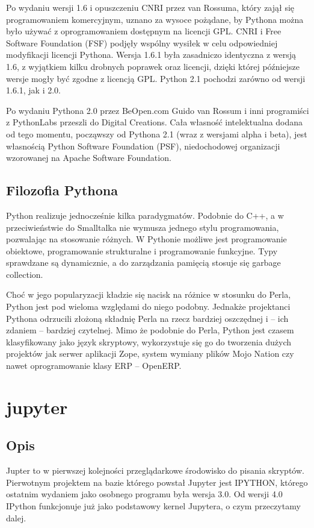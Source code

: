 \documentclass{article}
\begin{document}
Po wydaniu wersji 1.6 i opuszczeniu CNRI przez van Rossuma, który zajął się programowaniem komercyjnym, uznano za wysoce pożądane, by Pythona można było używać z oprogramowaniem dostępnym na licencji GPL. CNRI i Free Software Foundation (FSF) podjęły wspólny wysiłek w celu odpowiedniej modyfikacji licencji Pythona. Wersja 1.6.1 była zasadniczo identyczna z wersją 1.6, z wyjątkiem kilku drobnych poprawek oraz licencji, dzięki której późniejsze wersje mogły być zgodne z licencją GPL. Python 2.1 pochodzi zarówno od wersji 1.6.1, jak i 2.0.

Po wydaniu Pythona 2.0 przez BeOpen.com Guido van Rossum i inni programiści z PythonLabs przeszli do Digital Creations. Cała własność intelektualna dodana od tego momentu, począwszy od Pythona 2.1 (wraz z wersjami alpha i beta), jest własnością Python Software Foundation (PSF), niedochodowej organizacji wzorowanej na Apache Software Foundation.
 \subsection{Filozofia Pythona} 
 Python realizuje jednocześnie kilka paradygmatów. Podobnie do C++, a w przeciwieństwie do Smalltalka nie wymusza jednego stylu programowania, pozwalając na stosowanie różnych. W Pythonie możliwe jest programowanie obiektowe, programowanie strukturalne i programowanie funkcyjne. Typy sprawdzane są dynamicznie, a do zarządzania pamięcią stosuje się garbage collection.

Choć w jego popularyzacji kładzie się nacisk na różnice w stosunku do Perla, Python jest pod wieloma względami do niego podobny. Jednakże projektanci Pythona odrzucili złożoną składnię Perla na rzecz bardziej oszczędnej i – ich zdaniem – bardziej czytelnej. Mimo że podobnie do Perla, Python jest czasem klasyfikowany jako język skryptowy, wykorzystuje się go do tworzenia dużych projektów jak serwer aplikacji Zope, system wymiany plików Mojo Nation czy nawet oprogramowanie klasy ERP – OpenERP.
 \newpage
\section{jupyter}
\subsection{Opis}
Jupter to w pierwszej kolejności przeglądarkowe środowisko do pisania skryptów. Pierwotnym projektem na bazie którego powstał Jupyter jest IPYTHON, którego ostatnim wydaniem jako osobnego programu była wersja 3.0. Od wersji 4.0 IPython funkcjonuje już jako podstawowy kernel Jupytera, o czym przeczytamy dalej.
\end{document}
